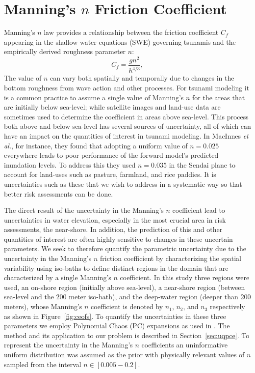 \section{Manning's $n$ Friction Coefficient} \label{sec:manning}

Manning's $n$ law provides a relationship between the friction coefficient
$C_f$ appearing in the shallow water equations (SWE) governing tsunamis and 
the empirically derived roughness parameter $n$:
\begin{equation}
    C_f = \frac{g n^2}{h^{4/3}},
\label{eq:coef}
\end{equation}
The value of $n$ can vary both spatially and temporally due to changes in the
bottom roughness from wave action and other processes.  For tsunami modeling it
is a common practice to assume a single value of Manning's $n$ for the areas
that are initially below sea-level; while satellite images and 
land-use data are sometimes used to determine the coefficient in areas above sea-level.  This
process both above and below sea-level has several sources of uncertainty, all
of which can have an impact on the quantities of interest in tsunami modeling.   
In MacInnes \emph{et al.}, for instance, they found that adopting a uniform value 
of $n = 0.025$ everywhere leads to poor performance of the forward model's predicted 
inundation levels.  To address this they used $n = 0.035$ in the Sendai plane to 
account for land-uses such as pasture, farmland, and rice paddies.  It is 
uncertainties such as these that we wish to address in a systematic way so that
better risk assessments can be done.

The direct result of the uncertainty in the Manning's $n$ coefficient lead to
uncertainties in water elevation,
especially in the most crucial area in risk assessments, the near-shore. In 
addition,  the prediction of this and other quantities of interest are often highly 
sensitive to changes in these uncertain parameters.  We seek to therefore 
quantify the parametric uncertainty due to the uncertainty in the Manning's $n$ 
friction coefficient by characterizing the spatial variability using
iso-baths to define distinct regions in the domain that are characterized by a
single Manning's $n$ coefficient.  In this study three regions were used, an
on-shore region (initially above sea-level), a near-shore region (between
sea-level and the 200 meter iso-bath), and the deep-water region (deeper than
200 meters), whose Manning's $n$ coefficient is denoted by $n_1$, $n_2$, and $n_3$ respectively 
as shown in Figure~\ref{fig:ceofs}. To quantify the uncertainties
in these three parameters we employ Polynomial Chaos (PC) 
expansions as used in \cite{sraj:2013a,sraj:2013b}.  The method and its 
application to our problem is
described in Section~\ref{sec:uqpce}.  To represent the uncertainty in the
Manning's $n$ coefficients an uninformative uniform distribution was assumed as 
the prior with physically relevant values of $n$ sampled from the interval 
$n \in [0.005-0.2]$.

